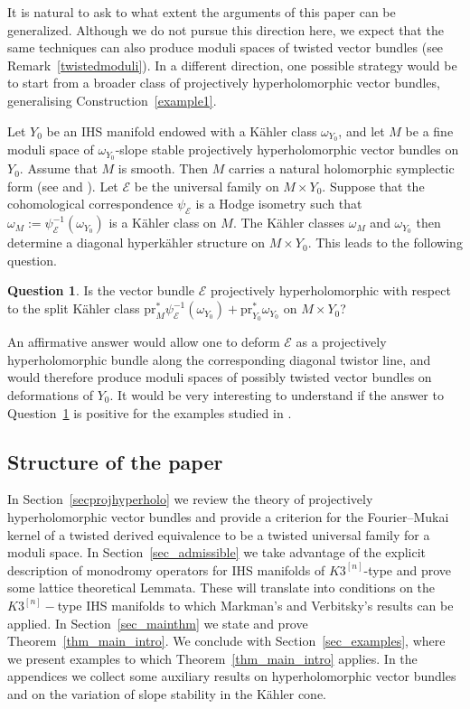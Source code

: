 \documentclass[12pt,a4paper]{amsart}
\theoremstyle{plain}
\theoremstyle{definition}
\newtheorem{mainquest}{Question}
\theoremstyle{remark}
\def\pr{\mathrm{pr}}
\newcommand{\kE}{\mathcal{E}}
\newcommand{\nn}{{[n]}}
\begin{document}
\quad

It is natural to ask to what extent the arguments of this paper can be generalized. Although we do not pursue this direction here, we expect that the same techniques can also produce moduli spaces of twisted vector bundles (see Remark~\ref{twistedmoduli}). In a different direction, one possible strategy would be to start from a broader class of projectively hyperholomorphic vector bundles, generalising Construction~\ref{example1}.

Let $Y_0$ be an IHS manifold endowed with a K\"ahler class $\omega_{Y_0}$, and let $M$ be a fine moduli space of $\omega_{Y_0}$-slope stable projectively hyperholomorphic vector bundles on $Y_0$. Assume that $M$ is smooth. Then $M$ carries a natural holomorphic symplectic form (see \cite{verbitsky-hyperholomorphic-bundles} and \cite[Section~7]{Bot24b}). Let $\mathcal E$ be the universal family on $M\times Y_0$. Suppose that the cohomological correspondence $\psi_{\kE}$ is a Hodge isometry such that $\omega_M:=\psi_{\kE}^{-1}(\omega_{Y_0})$ is a K\"ahler class on $M$. The K\"ahler classes $\omega_M$ and $\omega_{Y_0}$ then determine a diagonal hyperk\"ahler structure on $M\times Y_0$. This leads to the following question.

\begin{mainquest}\label{quest2}
Is the vector bundle $\mathcal E$ projectively hyperholomorphic with respect to the split K\"ahler class $\pr_M^*\psi_{\mathcal E}^{-1}(\omega_{Y_0})+\pr_{Y_0}^*\omega_{Y_0}$ on $M\times Y_0$?
\end{mainquest}
An affirmative answer would allow one to deform $\mathcal E$ as a projectively hyperholomorphic bundle along the corresponding diagonal twistor line, and would therefore produce moduli spaces of possibly twisted vector bundles on deformations of $Y_0$.
It would be very interesting to understand if the answer to Question~\ref{quest2} is positive for the examples studied in \cite{krug-reede-zhang}.


\subsection*{Structure of the paper}
In Section~\ref{secprojhyperholo} we review the theory of projectively hyperholomorphic vector bundles and provide a criterion for the Fourier--Mukai kernel of a twisted derived equivalence to be a twisted universal family for a moduli space.
In Section~\ref{sec_admissible} we take advantage of the explicit description of monodromy operators for IHS manifolds of $K3^{[n]}$-type and prove some lattice theoretical Lemmata. These will translate into conditions on the $K3^\nn-$type IHS manifolds to which Markman's and Verbitsky's results can be applied. 
In Section~\ref{sec_mainthm} we state and prove Theorem~\ref{thm_main_intro}.
We conclude with Section~\ref{sec_examples}, where we present examples to which Theorem~\ref{thm_main_intro} applies.
In the appendices we collect some auxiliary results on hyperholomorphic vector bundles and on the variation of slope stability in the K{\"a}hler cone.
\end{document}
